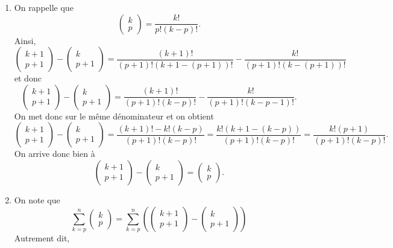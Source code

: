 \begin{enumerate}
      \item On rappelle que
      \[ \begin{pmatrix} k \\ p \end{pmatrix}  =   \frac{k!}{p! (k-p)!}.\]
      Ainsi,
      \[ \begin{pmatrix} k+1 \\ p+1 \end{pmatrix} - \begin{pmatrix} k \\ p+1 \end{pmatrix} = \frac{(k+1)!}{(p+1)! (k+1-(p+1))!} - \frac{k!}{(p+1)! (k-(p+1))!}\]
      et donc
      \[ \begin{pmatrix} k+1 \\ p+1 \end{pmatrix} - \begin{pmatrix} k \\ p+1 \end{pmatrix}
      = \frac{(k+1)!}{(p+1)! (k-p)!} - \frac{k!}{(p+1)! (k-p-1)!}.\]
      On met donc sur le même dénominateur et on obtient
      \[ \begin{pmatrix} k+1 \\ p+1 \end{pmatrix} - \begin{pmatrix} k \\ p+1 \end{pmatrix}
      = \frac{(k+1)! - k! (k-p)}{(p+1)! (k-p)!}  = \frac{k! (k+1  - (k-p))}{(p+1)! (k-p)!}   = \frac{k! (p+1)}{(p+1)! (k-p)!}.\]
      On arrive donc bien à
      \[ \begin{pmatrix} k+1 \\ p+1 \end{pmatrix} - \begin{pmatrix} k \\ p+1 \end{pmatrix} = \begin{pmatrix} k \\ p \end{pmatrix}.\]
      \item On note que
      \[ \sum_{k=p}^n \begin{pmatrix} k \\ p \end{pmatrix} = \sum_{k=p}^n \left( \begin{pmatrix} k+1 \\ p+1 \end{pmatrix} - \begin{pmatrix} k \\ p+1 \end{pmatrix} \right)\]
      Autrement dit,
     

\end{enumerate}
